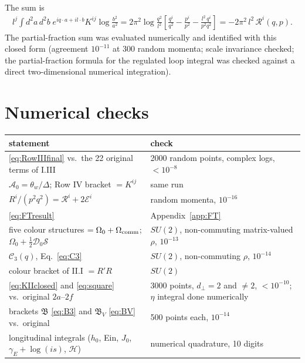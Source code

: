 \documentclass[10pt]{article}
\numberwithin{equation}{section}
\begin{document}
The sum is
\begin{align}
l^{j}\int d^{2}a\,d^{2}b\;e^{iq\cdot a+il\cdot b}K^{ij}\log\frac{b^{2}}{a^{2}}=2\pi^{2}\log\frac{q^{2}}{l^{2}}\left[\frac{q^{i}}{q^{2}}-\frac{p^{i}}{p^{2}}-\frac{l^{2}\,q^{i}}{p^{2}q^{2}}\right]=-2\pi^{2}\,l^{2}\,\mathcal{R}^{i}(q,p).
\end{align}
The partial-fraction sum was evaluated numerically and identified with this closed form (agreement $10^{-11}$ at 300 random momenta; scale invariance checked; the partial-fraction formula for the regulated loop integral was checked against a direct two-dimensional numerical integration).

\section{Numerical checks}\label{app:checks}
\begin{center}
\renewcommand{\arraystretch}{1.2}
\begin{tabular}{p{8.2cm}|p{8.6cm}}
statement & check\\ \hline
\eqref{eq:RowIIIfinal} vs.\ the 22 original terms of I.III & 2000 random points, complex logs, $<10^{-8}$\\
$\mathcal{A}_{0}=\theta_{w}/\Delta$; Row IV bracket $=K^{ij}$ & same run\\
$R^{i}/(p^{2}q^{2})=\mathcal{R}^{i}+2\mathcal{E}^{i}$ & random momenta, $10^{-16}$\\
\eqref{eq:FTresult} & Appendix~\ref{app:FT}\\
five colour structures $=\Omega_{0}+\Omega_{\rm comm}$; $\Omega_{0}+\tfrac12\mathcal{D}_{0}\mathcal{S}$ & $SU(2)$, non-commuting matrix-valued $\rho$, $10^{-13}$\\
$\mathcal{C}_{3}(q)$, Eq.~\eqref{eq:C3} & $SU(2)$, non-commuting $\rho$, $10^{-14}$\\
colour bracket of II.I $=R'R$ & $SU(2)$\\
\eqref{eq:KIIclosed} and \eqref{eq:square} vs.\ original $2a$--$2f$ & 3000 points, $d_{\perp}=2$ and $\neq2$, $<10^{-10}$; $\eta$ integral done numerically\\
brackets $\mathfrak{B}$ \eqref{eq:B3} and $\mathfrak{B}_{V}$ \eqref{eq:BV} vs.\ original & 500 points each, $10^{-14}$\\
longitudinal integrals ($h_{0}$, Ein, $J_{0}$, $\gamma_{E}+\log(is)$, $\mathcal{H}$) & numerical quadrature, 10 digits
\end{tabular}
\end{center}
\end{document}
